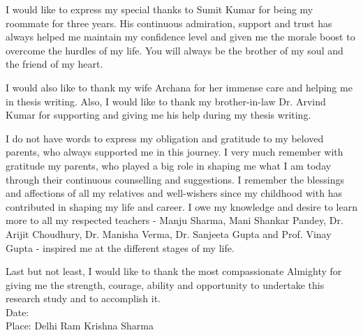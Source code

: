 I would like to express my special thanks to Sumit Kumar for being my roommate for three years. His continuous admiration, support and trust has always helped me maintain my confidence level and given me the morale boost to overcome the hurdles of my life. You will always be the brother of my soul and the friend of my heart.

I would also like to thank my wife Archana for her immense care and helping me in thesis writing. Also, I would like to thank my brother-in-law Dr. Arvind Kumar for supporting and giving me his help during my thesis writing.

I do not have words to express my obligation and gratitude to my beloved parents, who always supported me in this journey. I very much remember with gratitude my parents, who played a big role in shaping me what I am today through their continuous counselling and suggestions. I remember the blessings and affections of all my relatives and well-wishers since my childhood with has contributed in shaping my life and career. I owe my knowledge and desire to learn more to all my respected teachers - Manju Sharma, Mani Shankar Pandey, Dr. Arijit Choudhury, Dr. Manisha Verma, Dr. Sanjeeta Gupta and Prof. Vinay Gupta - inspired me at the different stages of my life.

Last but not least, I would like to thank the most compassionate Almighty for giving me the strength, courage, ability and opportunity to undertake this research study and to accomplish it.\\[3.0cm]
Date:\\
Place: Delhi \hfill Ram Krishna Sharma

